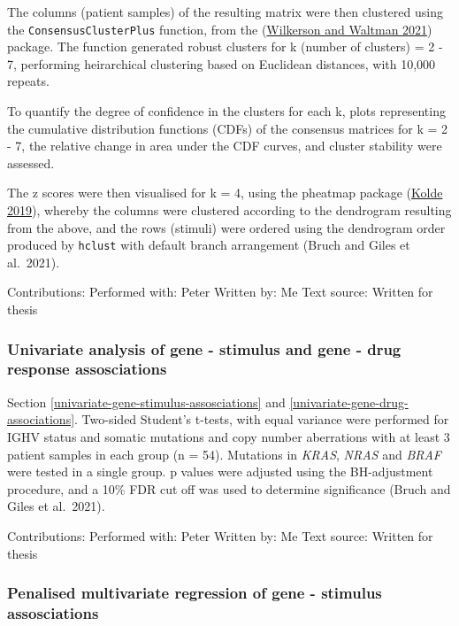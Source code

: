 \documentclass[11pt, a4paper, twosided]{book}
\begin{document}
The columns (patient samples) of the resulting matrix were then clustered using the \texttt{ConsensusClusterPlus} function, from the (\protect\hyperlink{ref-R-ConsensusClusterPlus}{Wilkerson and Waltman 2021}) package. The function generated robust clusters for k (number of clusters) = 2 - 7, performing heirarchical clustering based on Euclidean distances, with 10,000 repeats.

To quantify the degree of confidence in the clusters for each k, plots representing the cumulative distribution functions (CDFs) of the consensus matrices for k = 2 - 7, the relative change in area under the CDF curves, and cluster stability were assessed.

The z scores were then visualised for k = 4, using the pheatmap package (\protect\hyperlink{ref-R-pheatmap}{Kolde 2019}), whereby the columns were clustered according to the dendrogram resulting from the above, and the rows (stimuli) were ordered using the dendrogram order produced by \texttt{hclust} with default branch arrangement (Bruch and Giles et al.~2021).

Contributions:
Performed with: Peter
Written by: Me
Text source: Written for thesis

\hypertarget{univariate-gene-stimulus-associations-method}{%
\subsubsection{Univariate analysis of gene - stimulus and gene - drug response assosciations}\label{univariate-gene-stimulus-associations-method}}

Section \ref{univariate-gene-stimulus-assosciations} and \ref{univariate-gene-drug-associations}. Two-sided Student's t-tests, with equal variance were performed for IGHV status and somatic mutations and copy number aberrations with at least 3 patient samples in each group (n = 54). Mutations in \emph{KRAS}, \emph{NRAS} and \emph{BRAF} were tested in a single group. p values were adjusted using the BH-adjustment procedure, and a 10\% FDR cut off was used to determine significance (Bruch and Giles et al.~2021).

Contributions:
Performed with: Peter
Written by: Me
Text source: Written for thesis

\hypertarget{multivariate-gene-stimulus-assosciations-method}{%
\subsubsection{Penalised multivariate regression of gene - stimulus assosciations}\label{multivariate-gene-stimulus-assosciations-method}}
\end{document}
